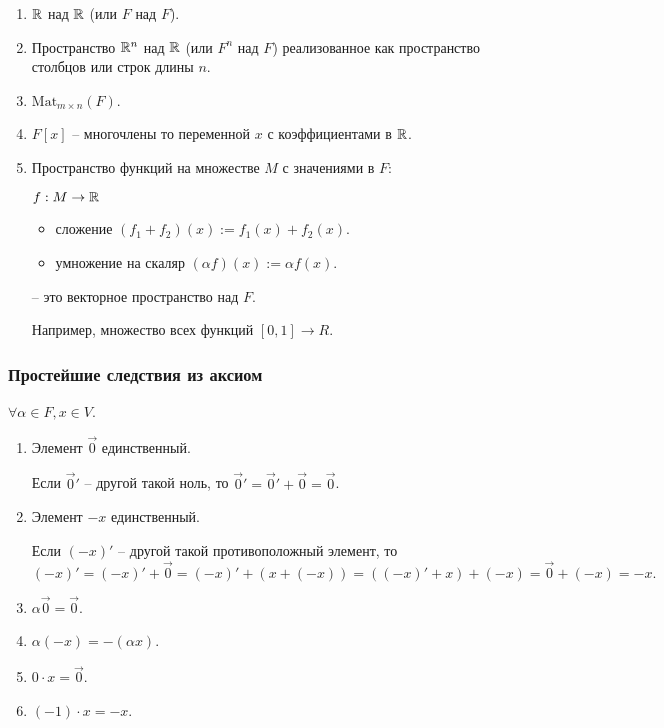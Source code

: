\begin{example}
    \begin{enumerate}~
    \item $\mathbb{R}$ над $\mathbb{R}$ (или $F$ над $F$).
    \item Пространство $\mathbb{R}^n$ над $\mathbb{R}$ (или $F^n$ над $F$) реализованное как пространство столбцов или строк длины $n$.
    \item $\text{Mat}_{m \times n}(F)$.
    \item $F[x]$ -- многочлены то переменной $x$ с коэффициентами в $\mathbb{R}$.
    \item Пространство функций на множестве $M$ с значениями в $F$:

        $f: M \rightarrow \mathbb{R}$

        \begin{itemize}[nosep]
        \item сложение $(f_1 + f_2)(x) := f_1(x) + f_2(x)$.
        \item умножение на скаляр $(\alpha f)(x) := \alpha f(x)$.
        \end{itemize}

        -- это векторное пространство над $F$.

        Например, множество всех функций $[0, 1] \to R$.
    \end{enumerate}
\end{example}


\subsubsection{Простейшие следствия из аксиом}

$\forall \alpha \in F, x \in V$.
\begin{enumerate}
\item
    Элемент $\overrightarrow{0}$ единственный.

    Если $\overrightarrow{0}'$ -- другой такой ноль, то $\overrightarrow{0}' = \overrightarrow{0}' + \overrightarrow{0} = \overrightarrow{0}$.

\item Элемент $-x$ единственный.

    Если $(-x)'$ -- другой такой противоположный элемент, то
    \begin{equation*}
        (-x)' = (-x)' + \overrightarrow{0} = (-x)' + (x + (-x)) = ((-x)' + x) + (-x) = \overrightarrow{0} + (-x) = -x
    .\end{equation*}
\item $\alpha \overrightarrow{0} = \overrightarrow{0}$.
\item $\alpha (-x) = -(\alpha x)$.
\item $0 \cdot x = \overrightarrow{0}$.
\item $(-1) \cdot x = -x$.
\end{enumerate}


